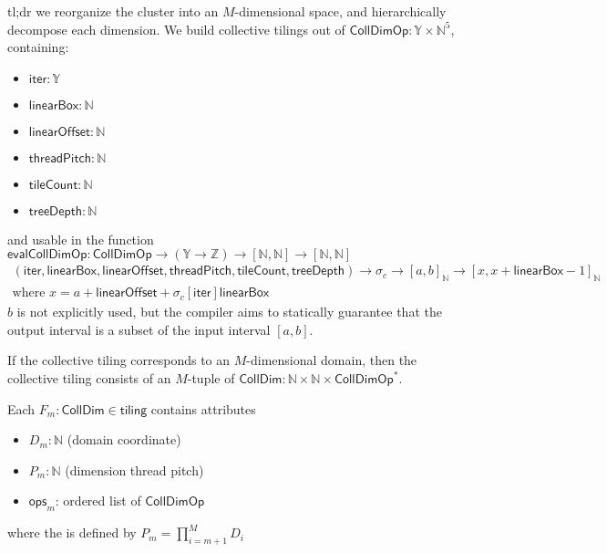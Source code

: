 \filbreak
{}

tl;dr we reorganize the cluster into an $M$-dimensional space, and hierarchically decompose each dimension.
\filbreak
We build collective tilings out of $\mathsf{CollDimOp}: \mathbb{Y} \times \mathbb{N}^5$, containing:
\begin{itemize}
  \item $\mathsf{iter}: \mathbb{Y}$
  \filbreak
  \item $\mathsf{linearBox}: \mathbb{N}$
  \filbreak
  \item $\mathsf{linearOffset}: \mathbb{N}$
  \filbreak
  \item $\mathsf{threadPitch}: \mathbb{N}$
  \filbreak
  \item $\mathsf{tileCount}: \mathbb{N}$
  \filbreak
  \item $\mathsf{treeDepth}: \mathbb{N}$
\end{itemize}
\filbreak
and usable in the function $\mathsf{evalCollDimOp}: \mathsf{CollDimOp} \to (\mathbb{Y} \to \mathbb{Z}) \to [\mathbb{N}, \mathbb{N}] \to [\mathbb{N}, \mathbb{N}]$
\begin{gather*}
    (\mathsf{iter}, \mathsf{linearBox}, \mathsf{linearOffset}, \mathsf{threadPitch}, \mathsf{tileCount}, \mathsf{treeDepth}) \to
    \sigma_c \to
    [a, b]_\mathbb{N} \to
    [x, x + \mathsf{linearBox} - 1]_\mathbb{N} \\
    \text{where } x = a + \mathsf{linearOffset} + \sigma_c[\mathsf{iter}] \mathsf{linearBox}
\end{gather*}
$b$ is not explicitly used, but the compiler aims to statically guarantee that the output interval is a subset of the input interval $[a, b]$.

\filbreak
If the collective tiling corresponds to an $M$-dimensional domain, then the collective tiling consists of an $M$-tuple of $\mathsf{CollDim}: \mathbb{N} \times \mathbb{N} \times \mathsf{CollDimOp}^*$.

\filbreak
Each $F_m : \mathsf{CollDim} \in \mathsf{tiling}$ contains attributes
\begin{itemize}
  \item $D_m: \mathbb{N}$ (domain coordinate)
  \filbreak
  \item $P_m: \mathbb{N}$ (dimension thread pitch)
  \filbreak
  \item $\mathsf{ops}_m$: ordered list of $\mathsf{CollDimOp}$
\end{itemize}
where the  is defined by $P_m = \prod_{i = m+1}^M D_i$

